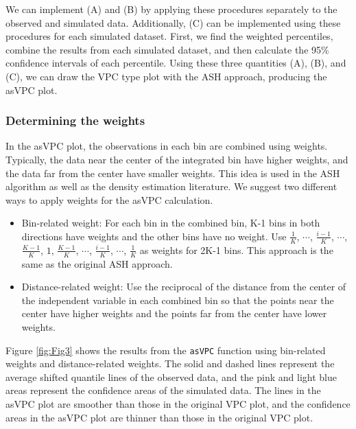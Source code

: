 We can implement (A) and (B) by applying these procedures separately to the observed and simulated data. Additionally, (C) can be implemented using these procedures for each simulated dataset. First, we find the weighted percentiles, combine the results from each simulated dataset, and then calculate the 95\(\%\) confidence intervals of each percentile. Using these three quantities (A), (B), and (C), we can draw the VPC type plot with the ASH approach, producing the asVPC plot.

\hypertarget{determining-the-weights}{%
\subsubsection{Determining the weights}\label{determining-the-weights}}

In the asVPC plot, the observations in each bin are combined using weights. Typically, the data near the center of the integrated bin have higher weights, and the data far from the center have smaller weights. This idea is used in the ASH algorithm as well as the density estimation literature. We suggest two different ways to apply weights for the asVPC calculation.

\begin{itemize}
\item
  Bin-related weight: For each bin in the combined bin, K-1 bins in both directions have weights and the other bins have no weight. Use \(\frac{1}{K}\), \(\cdots\), \(\frac{i-1}{K}\), \(\cdots\), \(\frac{K-1}{K}\), \(1\), \(\frac{K-1}{K}\), \(\cdots\), \(\frac{i-1}{K}\), \(\cdots\), \(\frac{1}{K}\) as weights for 2K-1 bins. This approach is the same as the original ASH approach.
\item
  Distance-related weight: Use the reciprocal of the distance from the center of the independent variable in each combined bin so that the points near the center have higher weights and the points far from the center have lower weights.
\end{itemize}

Figure \ref{fig:Fig3} shows the results from the \texttt{asVPC} function using bin-related weights and distance-related weights. The solid and dashed lines represent the average shifted quantile lines of the observed data, and the pink and light blue areas represent the confidence areas of the simulated data. The lines in the asVPC plot are smoother than those in the original VPC plot, and the confidence areas in the asVPC plot are thinner than those in the original VPC plot.

